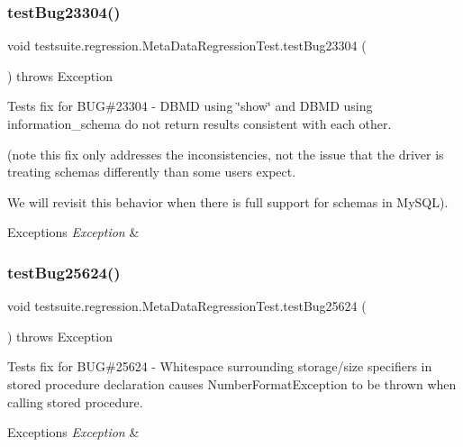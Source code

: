 \subsubsection{\texorpdfstring{test\+Bug23304()}{testBug23304()}}
{\footnotesize\ttfamily void testsuite.\+regression.\+Meta\+Data\+Regression\+Test.\+test\+Bug23304 (\begin{DoxyParamCaption}{ }\end{DoxyParamCaption}) throws Exception}

Tests fix for B\+UG\#23304 -\/ D\+B\+MD using \char`\"{}show\char`\"{} and D\+B\+MD using information\+\_\+schema do not return results consistent with each other.

(note this fix only addresses the inconsistencies, not the issue that the driver is treating schemas differently than some users expect.

We will revisit this behavior when there is full support for schemas in My\+S\+QL).


\begin{DoxyExceptions}{Exceptions}
{\em Exception} & \\
\hline
\end{DoxyExceptions}
\mbox{\label{classtestsuite_1_1regression_1_1_meta_data_regression_test_a2a97b03d5a86fcd988e7648006a385a6}} 
\subsubsection{\texorpdfstring{test\+Bug25624()}{testBug25624()}}
{\footnotesize\ttfamily void testsuite.\+regression.\+Meta\+Data\+Regression\+Test.\+test\+Bug25624 (\begin{DoxyParamCaption}{ }\end{DoxyParamCaption}) throws Exception}

Tests fix for B\+UG\#25624 -\/ Whitespace surrounding storage/size specifiers in stored procedure declaration causes Number\+Format\+Exception to be thrown when calling stored procedure.


\begin{DoxyExceptions}{Exceptions}
{\em Exception} & \\
\hline
\end{DoxyExceptions}
\mbox{\label{classtestsuite_1_1regression_1_1_meta_data_regression_test_ad4bf6071c2581485e1d8d44e36d385ae}} 

